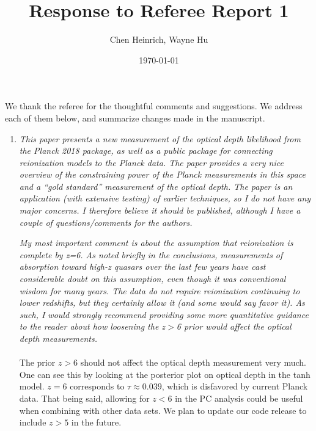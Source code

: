 \documentclass[10pt]{article}
\title{Response to Referee Report 1}
\author{Chen Heinrich, Wayne Hu}
\date{\today}
\begin{document}
\maketitle

We thank the referee for the thoughtful comments and suggestions. We address each of them below, and summarize changes made in the manuscript. 

\begin{enumerate}
    \item{
        \textit{This paper presents a new measurement of the optical depth likelihood from the Planck 2018 package, as well as a public package for connecting reionization models to the Planck data. The paper provides a very nice overview of the constraining power of the Planck measurements in this space and a “gold standard” measurement of the optical depth. The paper is an application (with extensive testing) of earlier techniques, so I do not have any major concerns. I therefore believe it should be published, although I have a couple of questions/comments for the authors.}

        \textit{My most important comment is about the assumption that reionization is complete by z=6. As noted briefly in the conclusions, measurements of absorption toward high-z quasars over the last few years have cast considerable doubt on this assumption, even though it was conventional wisdom for many years. The data do not require reionization continuing to lower redshifts, but they certainly allow it (and some would say favor it). As such, I would strongly recommend providing some more quantitative guidance to the reader about how loosening the z$>$6 prior would affect the optical depth measurements.}\\
        \\
        The prior $z>6$ should not affect the optical depth measurement very much. One can see this by looking at the posterior plot on optical depth in the tanh model. $z=6$ corresponds to $\tau \approx 0.039$, which is disfavored by current Planck data. That being said, allowing for $z<6$ in the PC analysis could be useful when combining with other data sets. We plan to update our code release to include $z>5$ in the future.
    }
    

\end{enumerate}
\end{document}

